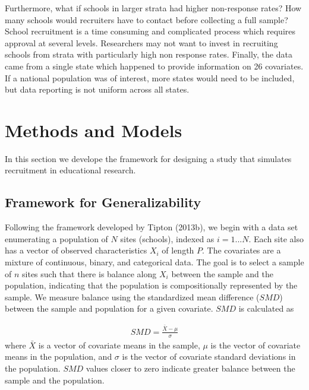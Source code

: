 \documentclass[man,floatsintext]{apa6}
\begin{document}
Furthermore, what if schools in larger strata had higher non-response rates? How many schools would recruiters have to contact before collecting a full sample? School recruitment is a time consuming and complicated process which requires approval at several levels. Researchers may not want to invest in recruiting schools from strata with particularly high non response rates. Finally, the data came from a single state which happened to provide information on 26 covariates. If a national population was of interest, more states would need to be included, but data reporting is not uniform across all states.

\hypertarget{methods-and-models}{%
\section{Methods and Models}\label{methods-and-models}}

In this section we develope the framework for designing a study that simulates recruitment in educational research.

\hypertarget{framework-for-generalizability}{%
\subsection{Framework for Generalizability}\label{framework-for-generalizability}}

Following the framework developed by Tipton (2013b), we begin with a data set enumerating a population of \(N\) sites (schools), indexed as \(i = 1 ... N\). Each site also has a vector of observed characteristics \(X_i\) of length \(P\). The covariates are a mixture of continuous, binary, and categorical data. The goal is to select a sample of \(n\) sites such that there is balance along \(X_i\) between the sample and the population, indicating that the population is compositionally represented by the sample. We measure balance using the standardized mean difference (\(SMD\)) between the sample and population for a given covariate. \(SMD\) is calculated as

\begin{align}
  SMD = \frac{\bar{X}-\mu}{\sigma}
\end{align}
where \(\bar{X}\) is a vector of covariate means in the sample, \(\mu\) is the vector of covariate means in the population, and \(\sigma\) is the vector of covariate standard deviations in the population. \(SMD\) values closer to zero indicate greater balance between the sample and the population.
\end{document}
